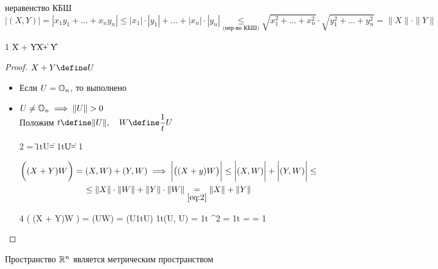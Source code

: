 \begin{statement}{неравенство КБШ}
	$$ |(X, Y)| = |x_1y_1 + ... + x_ny_n| \le |x_1| \cdot |y_1| + ... + |x_n| \cdot |y_n| \underset{\text{(нер-во КБШ)}}\le \sqrt{x_1^2 + ... + x_n^2} \cdot \sqrt{y_1^2 + ... + y_n^2} = \|X\| \cdot \|Y\| $$
\end{statement}

\begin{statement}
	\begin{equ}1
		\|X + Y\| \le \|X\| + \|Y\|
	\end{equ}
\end{statement}

\begin{proof}
	$ X + Y \define U $
	\begin{itemize}
		\item Если $ U = \mathbb{O}_{n} $, то  выполнено
		\item $ U \ne \mathbb{O}_{n} \implies \|U\| > 0 $ \\
		Положим $ t \define \|U\|, \quad W \define \dfrac1tU $
		\begin{equ}2
			 = \|\frac1tU\| = \frac1t\|U\| = 1
		\end{equ}
		\begin{multline}\lbl3
			\bigg( (X + Y)W \bigg) = (X, W) + (Y, W) \implies \bigg| \big( (X + y)W \big) \bigg| \le \bigg| (X, W) \bigg| + \bigg| (Y, W) \bigg| \le \\ \le \norm{X} \cdot \norm{W} + \norm{Y} \cdot \norm{W} \underset{\eref2}= \norm{X} + \norm{Y}
		\end{multline}
		\begin{equ}4
			\bigg( (X + Y)W \bigg) = (UW) = (U\frac1tU) \implies \frac1t(U, U) = \frac1t ^2 = \frac1t \cdot \norm{U} \cdot {} =  =  \underimp3 1
		\end{equ}
	\end{itemize}
\end{proof}

\begin{statement}
	Пространство $ \mathbb{R}^n $ является метрическим пространством
\end{statement}

